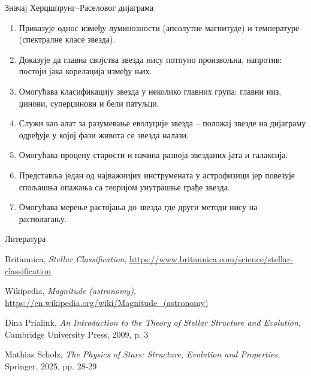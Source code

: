 \documentclass[aspectratio=169, xcolor=table, 10pt]{beamer}
\begin{document}
\begin{frame}{Значај Херцшпрунг–Раселовог дијаграма}
  \begin{enumerate}
    \item Приказује однос између луминозности (апсолутне магнитуде) и температуре (спектралне класе звезда).
    \item Доказује да главна својства звезда нису потпуно произвољна, напротив: постоји јака корелација између њих.
    \item Омогућава класификацију звезда у неколико главних група: главни низ, џинови, суперџинови и бели патуљци.
    \item Служи као алат за разумевање еволуције звезда – положај звезде на дијаграму одређује у којој фази живота се звезда налази.
    \item Омогућава процену старости и начина развоја звезданих јата и галаксија.
    \item Представља један од најважнијих инструмената у астрофизици јер повезује спољашња опажања са теоријом унутрашње грађе звезда.
    \item Омогућава мерење растојања до звезда где други методи нису на располагању.
  \end{enumerate}
\end{frame}

\begin{frame}{Литература}
    \begin{thebibliography}{9}

      Britannica,
      \textit{Stellar Classification},
      \url{https://www.britannica.com/science/stellar-classification}

      Wikipedia,
      \textit{Magnitude (astronomy)},
      \url{https://en.wikipedia.org/wiki/Magnitude_(astronomy)}

      Dina Prialink,
      \textit{An Introduction to the Theory of Stellar Structure and Evolution},
      Cambridge University Press, 2009, p. 3

      Mathias Scholz,
      \textit{The Physics of Stars: Structure, Evolution and Properties},
      Springer, 2025, pp. 28-29

    \end{thebibliography}
\end{frame}
\end{document}
